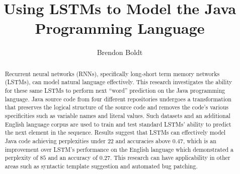 \documentclass[runningheads,a4paper]{llncs}
\begin{document}
\mainmatter  %

\title{Using LSTMs to Model the Java Programming Language}


%
%
\author{Brendon Boldt}
%


%
%

\maketitle

\begin{abstract} 
Recurrent neural networks (RNNs), specifically long-short term memory 
networks (LSTMs), can model natural language effectively. This research 
investigates the ability for these same LSTMs to perform next ``word'' 
prediction on the Java programming 
language. Java source code from four different repositories
undergoes a transformation that preserves the logical structure of the 
source code and removes the code's various specificities such as 
variable names and literal values. Such datasets and an additional English 
language corpus are used to train and test standard LSTMs' ability to predict
the next element in the sequence. 
Results suggest that LSTMs can effectively model
Java code achieving perplexities under $22$ and accuracies above $0.47$, which
is an improvement over LSTM's performance on the English language which demonstrated
a perplexity of $85$ and an accuracy of $0.27$. This research can have
applicability in other areas such as syntactic template suggestion and automated bug
patching.
\end{abstract} 
\end{document}
